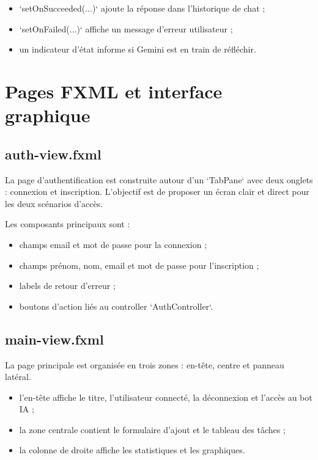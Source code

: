 \documentclass[11pt,a4paper]{article}
\begin{document}
\begin{itemize}[leftmargin=1.4em]
    \item `setOnSucceeded(...)` ajoute la réponse dans l'historique de chat ;
    \item `setOnFailed(...)` affiche un message d'erreur utilisateur ;
    \item un indicateur d'état informe si Gemini est en train de réfléchir.
\end{itemize}

\section{Pages FXML et interface graphique}

\subsection{auth-view.fxml}

La page d'authentification est construite autour d'un `TabPane` avec deux onglets : connexion et inscription. L'objectif est de proposer un écran clair et direct pour les deux scénarios d'accès.

Les composants principaux sont :
\begin{itemize}[leftmargin=1.4em]
    \item champs email et mot de passe pour la connexion ;
    \item champs prénom, nom, email et mot de passe pour l'inscription ;
    \item labels de retour d'erreur ;
    \item boutons d'action liés au controller `AuthController`.
\end{itemize}

\subsection{main-view.fxml}

La page principale est organisée en trois zones : en-tête, centre et panneau latéral.

\begin{itemize}[leftmargin=1.4em]
    \item l'en-tête affiche le titre, l'utilisateur connecté, la déconnexion et l'accès au bot IA ;
    \item la zone centrale contient le formulaire d'ajout et le tableau des tâches ;
    \item la colonne de droite affiche les statistiques et les graphiques.
\end{itemize}
\end{document}
